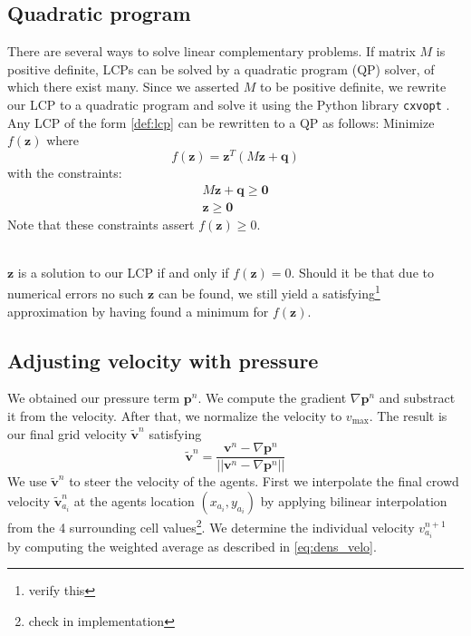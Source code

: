 \documentclass{article}
\let\oldtil\tilde
\renewcommand{\vec}[1]{\mathbf{#1}}
\renewcommand{\tilde}[1]{\oldtil{\mathbf{#1}}}
\begin{document}
\subsection{Quadratic program}
There are several ways to solve linear complementary problems. If  matrix $M$ is positive definite, LCPs can be solved by a quadratic program (QP) solver, of which there exist many. Since we asserted $M$ to be positive definite, we rewrite our LCP to a quadratic program and solve it using the Python library \texttt{cxvopt} \cite{cvxopt}.
\ \\
Any LCP of the form \eqref{def:lcp} can be rewritten to a QP as follows: Minimize $f(\vec{z})$ where
\begin{equation}
	f(\vec{z}) = \vec{z}^T\left( M\vec{z}+\vec{q} \right)
\end{equation}
with the constraints:
\begin{align}
	M\vec{z} + \vec{q}\geq\vec{0}\\
	\vec{z}\geq\vec{0}
\end{align}
Note that these constraints assert $f(\vec{z}) \geq 0$. 

\ \\
$\vec{z}$ is a solution to our LCP if and only if $f(\vec{z})=0$. Should it be that due to numerical errors no such $\vec{z}$ can be found, we still yield a satisfying\footnote{verify this} approximation by having found a minimum for $f(\vec{z})$.
\subsection{Adjusting velocity with pressure}
We obtained our pressure term $\vec{p}^n$. We compute the gradient $\nabla\vec{p}^n$ and substract it from the velocity. After that, we normalize the velocity to $v_{\max}$.
The result is our final grid velocity $\tilde{v}^n$ satisfying
\begin{equation}
	\tilde{v}^n = \frac{\vec{v}^n-\nabla\vec{p}^n}{||\vec{v}^n-\nabla\vec{p}^n||}
	\label{eq:finvelocity}
\end{equation}
We use $\tilde{v}^n$ to steer the velocity of the agents. First we interpolate the final crowd velocity $\tilde{v}^n_{a_i}$ at the agents location $(x_{a_i},y_{a_i})$ by applying bilinear interpolation from the 4 surrounding cell values\footnote{check in implementation}. We determine the individual velocity $v^{n+1}_{a_i}$ by computing the weighted average as described in \eqref{eq:dens_velo}.
\newpage

 
\end{document}

